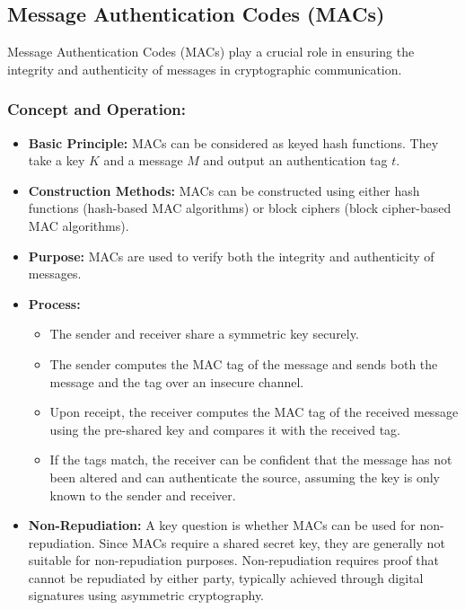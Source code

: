 \documentclass[12pt]{article}
\begin{document}
\subsection*{Message Authentication Codes (MACs)}

Message Authentication Codes (MACs) play a crucial role in ensuring the integrity and authenticity of messages in cryptographic communication.

\subsubsection*{Concept and Operation:}
\begin{itemize}
    \item \textbf{Basic Principle:} MACs can be considered as keyed hash functions. They take a key \( K \) and a message \( M \) and output an authentication tag \( t \).
    \item \textbf{Construction Methods:} MACs can be constructed using either hash functions (hash-based MAC algorithms) or block ciphers (block cipher-based MAC algorithms).
    \item \textbf{Purpose:} MACs are used to verify both the integrity and authenticity of messages.
    \item \textbf{Process:}
    \begin{itemize}
        \item The sender and receiver share a symmetric key securely.
        \item The sender computes the MAC tag of the message and sends both the message and the tag over an insecure channel.
        \item Upon receipt, the receiver computes the MAC tag of the received message using the pre-shared key and compares it with the received tag.
        \item If the tags match, the receiver can be confident that the message has not been altered and can authenticate the source, assuming the key is only known to the sender and receiver.
    \end{itemize}
    \item \textbf{Non-Repudiation:} A key question is whether MACs can be used for non-repudiation. Since MACs require a shared secret key, they are generally not suitable for non-repudiation purposes. Non-repudiation requires proof that cannot be repudiated by either party, typically achieved through digital signatures using asymmetric cryptography.
\end{itemize}
\end{document}
